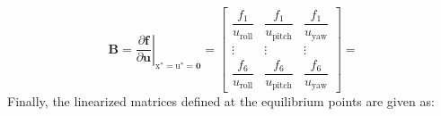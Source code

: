 \documentclass[3p]{elsarticle}
\begin{document}
\begin{equation}
    \mathbf{B} = \left.\dfrac{\partial \mathbf{f}}{\partial \mathbf{u}}\right|_{\boldsymbol{{\mathrm{x}}}^*= \boldsymbol{{\mathrm{u}}}^*=\boldsymbol{0}} = \begin{bmatrix}
        \dfrac{f_1}{u_\text{roll}} & \dfrac{f_1}{u_\text{pitch}} & \dfrac{f_1}{u_\text{yaw}}\\
        \vdots & \vdots & \vdots \\
        \dfrac{f_6}{u_\text{roll}} & \dfrac{f_6}{u_\text{pitch}} & \dfrac{f_6}{u_\text{yaw}}
    \end{bmatrix} = 
\end{equation}
Finally, the linearized matrices defined at the equilibrium points are given as:
\end{document}
